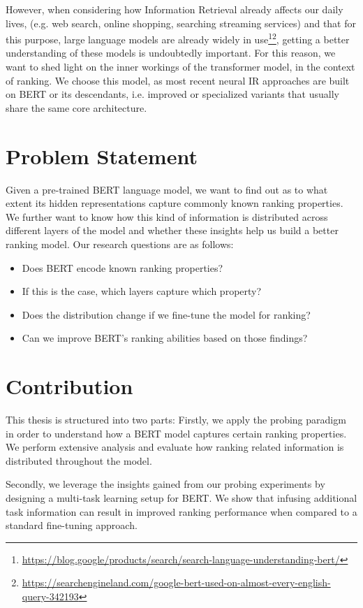 However, when considering how Information Retrieval already affects our daily lives, (e.g. web search, online shopping, searching streaming services) and that for this purpose, large language models are already widely in use\footnote{\url{https://blog.google/products/search/search-language-understanding-bert/}}\footnote{\url{https://searchengineland.com/google-bert-used-on-almost-every-english-query-342193}}, getting a better understanding of these models is undoubtedly important. For this reason, we want to shed light on the inner workings of the  \citep{devlin-etal-2019-bert} transformer model, in the context of ranking. We choose this model, as most recent neural IR approaches are built on BERT or its descendants, i.e. improved or specialized variants that usually share the same core architecture.

\section{Problem Statement}
Given a pre-trained BERT language model, we want to find out as to what extent its hidden representations capture commonly known ranking properties. We further want to know how this kind of information is distributed across different layers of the model and whether these insights help us build a better ranking model. Our research questions are as follows:
\begin{itemize}
    \item Does BERT encode known ranking properties?
    \item If this is the case, which layers capture which property?
    \item Does the distribution change if we fine-tune the model for ranking?
    \item Can we improve BERT's ranking abilities based on those findings?
\end{itemize}

\section{Contribution}
This thesis is structured into two parts: Firstly, we apply the probing paradigm in order to understand how a BERT model captures certain ranking properties. We perform extensive analysis and evaluate how ranking related information is distributed throughout the model.

Secondly, we leverage the insights gained from our probing experiments by designing a multi-task learning setup for BERT. We show that infusing additional task information can result in improved ranking performance when compared to a standard fine-tuning approach.

